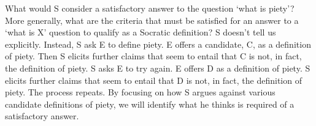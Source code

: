 \documentclass[oneside]{article}
\begin{document}

\noindent What would S consider a satisfactory answer to the question `what is piety'? More generally, what are the criteria that must be satisfied for an answer to a `what is X' question to qualify as a Socratic definition? S doesn't tell us explicitly. Instead,  S ask E to define piety. E offers a candidate, C, as a definition of piety. Then S elicits further claims that seem to entail that C is not, in fact, the definition of piety. S asks E to try again. E offers D as a definition of piety. S elicits further claims that seem to entail that D is not, in fact, the definition of piety. The process repeats. 
By focusing on how S argues against various candidate definitions of piety, we will identify what he thinks is required of a satisfactory answer. 
\end{document}
